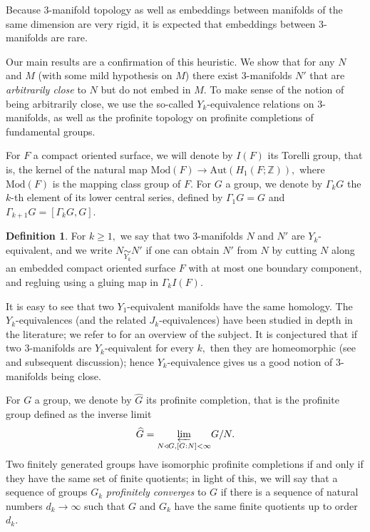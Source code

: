 \documentclass[12pt]{amsart}
\theoremstyle{definition}
\newtheorem{dfn}[thm]{Definition}
\newcommand{\ra}{\rightarrow}
\newcommand{\Z}{\mathbb{Z}}
\begin{document}
Because $3$-manifold topology as well as embeddings between manifolds of the same dimension are very rigid, it is expected that embeddings between $3$-manifolds are rare.

Our main results are a confirmation of this heuristic. We show that for any $N$ and $M$ (with some mild hypothesis on $M$) there exist $3$-manifolds $N'$
that are \textit{arbitrarily close} to $N$ but do not embed in $M.$ To make sense of the notion of being arbitrarily close, we use the so-called $Y_k$-equivalence relations on $3$-manifolds, as well as the profinite topology on profinite completions of fundamental groups.

For $F$ a compact oriented surface, we will denote by $I(F)$ its Torelli group, that is, the kernel of the natural map $\mathrm{Mod}(F)\longrightarrow \mathrm{Aut}(H_1(F;\Z)),$ where $\mathrm{Mod}(F)$ is the mapping class group of $F.$ For $G$ a group, we denote by $\Gamma_k G$ the $k$-th element of its lower central series, defined by $\Gamma_1 G=G$ and $\Gamma_{k+1}G=[\Gamma_kG,G].$


\begin{dfn}
	\label{def:Y_kequiv} For $k\geq 1,$ we say that two $3$-manifolds $N$ and $N'$ are $Y_k$-equivalent, and we write $N\underset{Y_k}{\sim}N'$ if one can obtain $N'$ from $N$ by cutting $N$ along an embedded compact oriented surface $F$ with at most one boundary component, and regluing using a gluing map in $\Gamma_k I(F).$
\end{dfn}
It is easy to see that two $Y_1$-equivalent manifolds have the same homology. The $Y_k$-equivalences (and the related $J_k$-equivalences) have been studied in depth in the literature; we refer to \cite{Mas:notes} for an overview of the subject. It is conjectured that if two $3$-manifolds are $Y_k$-equivalent for every $k,$ then they are homeomorphic (see \cite[Goussarov-Habiro Conjecture]{Mas:notes} and subsequent discussion); hence $Y_k$-equivalence gives us a good notion of $3$-manifolds being close.

For $G$ a group, we denote by $\widehat{G}$ its profinite completion, that is the profinite group defined as the inverse limit
$$\widehat{G}=\underset{N\triangleleft G, [G:N]<\infty}{\varprojlim} G/N.$$ Two finitely generated groups have isomorphic profinite completions if and only if they have the same set of finite quotients; in light of this, we will say that a sequence of groups $G_k$ \emph{profinitely converges} to $G$ if there is a sequence of natural numbers $d_k\ra \infty$ such that $G$ and $G_k$ have the same finite quotients up to order $d_k.$
\end{document}
